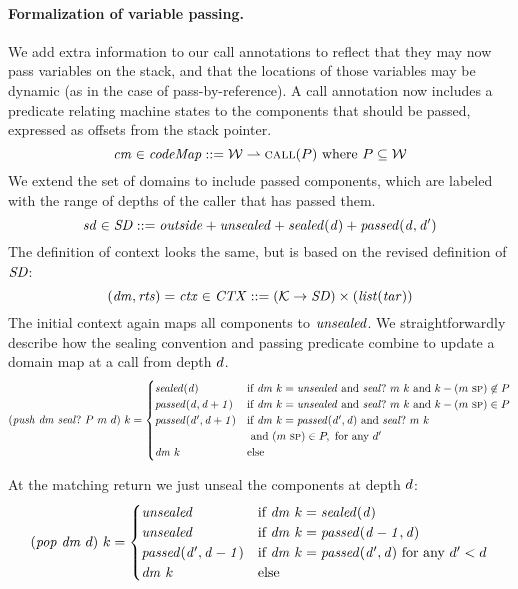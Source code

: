 \documentclass[acmsmall,review,anonymous]{acmart}\settopmatter{printfolios=true,printccs=false,printacmref=false}
\begin{document}
{\paragraph{Formalization of variable passing.}
We add extra information to our call
annotations to reflect that they may now pass variables on the stack, and that the locations
of those variables may be dynamic (as in the case of pass-by-reference).
A call annotation now includes a predicate relating machine states to the components
that should be passed, expressed as offsets from the stack pointer.
\[\mathit{cm} \in \mathit{codeMap} ::= {\mathcal W} \rightharpoonup \text{\sc call}(P)~\mbox{\rm where}~P \subseteq {\mathcal W}\]
We extend the set of domains to include passed components,
which are labeled with the range of depths of the caller that has passed them.
\[\mathit{sd} \in \mathit{SD} ::= \mathit{outside} + \mathit{unsealed} + \mathit{sealed(d)} + \mathit{passed(d,d')}\]
The definition of context looks the same, but is based on the revised definition of \(\mathit{SD}\):
\[(\mathit{dm},\mathit{rts}) = \mathit{ctx} \in \mathit{CTX} ::= ({\mathcal K} \rightarrow \mathit{SD})
\times (\mathit{list} (\mathit{tar})) \]
The initial context again maps all components to \(\mathit{unsealed}\).
We straightforwardly describe how the sealing convention and passing predicate combine to
update a domain map at a call from depth \(d\).
\[(\mathit{push} ~ \mathit{dm} ~ \mathit{seal?} ~ P ~ m ~ d) ~ k =
\begin{cases}
  \mathit{sealed(d)}              & \text{if } \mathit{dm} ~ k = \mathit{unsealed} \text{ and }
                                 \mathit{seal?} ~ m ~ k \text{ and }
                                 k - (m ~ \textsc{sp}) \not \in P \\
  \mathit{passed(d,d+1)}     & \text{if } \mathit{dm} ~ k = \mathit{unsealed} \text{ and }
                                 \mathit{seal?} ~ m ~ k \text{ and }
                                 k - (m ~ \textsc{sp}) \in P \\
  \mathit{passed(d',d+1)}    & \text{if } \mathit{dm} ~ k = \mathit{passed(d',d)} \text{ and }
                                 \mathit{seal?} ~ m ~ k \\
                               & \text{ and } (m ~ \textsc{sp}) \in P, \text{ for any } d' \\
  \mathit{dm}~k & \text{else} \\
\end{cases}\]

At the matching return we just unseal the components at depth \(d\):
%
\[(\mathit{pop} ~ \mathit{dm} ~ d) ~ k =
\begin{cases}
  \mathit{unsealed}                 & \text{if } \mathit{dm} ~ k = \mathit{sealed(d)} \\
  \mathit{unsealed}                 & \text{if } \mathit{dm} ~ k = \mathit{passed(d-1,d)} \\
  \mathit{passed(d',d-1)} & \text{if } \mathit{dm} ~ k = \mathit{passed(d',d)}
                              \text{ for any } d' < d \\
  \mathit{dm}~k        & \text{else} \\
\end{cases}\]

}
\end{document}

